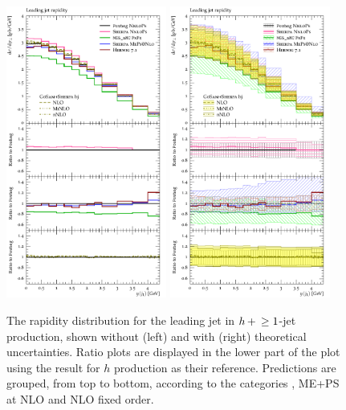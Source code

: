 \begin{figure}[t!]
  \centering
  \includegraphics[width=0.47\textwidth]{figures/hjetscomp_u_jet1_y.pdf}
  \hfill
  \includegraphics[width=0.47\textwidth]{figures/hjetscomp_jet1_y.pdf}
  \caption{\label{fig:hjetscomp:results:1obs:j1y}%
    The rapidity distribution for the leading jet in $h\!\text{~+~}\!\ge1$-jet
    production, shown without (left) and with (right) theoretical
    uncertainties. Ratio plots are displayed in the lower part of the
    plot using the \Powheg \NNLOPS result for $h$ production as their
    reference. Predictions are grouped, from top to bottom, according
    to the categories \NNLOPS, ME+PS at NLO and NLO fixed order.}
\end{figure}

